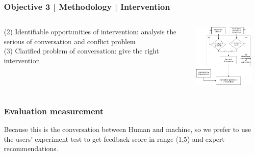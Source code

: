 \documentclass{beamer}
\begin{document}
\begin{frame}
\frametitle{Objective 3 | Methodology | Intervention}
\begin{columns}
	
	\begin{column}{.45\textwidth}
		(2) Identifiable opportunities of intervention: analysis the serious of conversation and conflict problem \\
		
		
		(3) Clarified problem of conversation: give the right intervention\\
	
	\end{column}
	\begin{column}{.55\textwidth}
		\includegraphics[width=50mm]{tsv.png}	
	\end{column}
	
\end{columns}
\end{frame}

\begin{frame}
\frametitle{Evaluation measurement}
Because this is the conversation between Human and machine, so we prefer to use the users' experiment test to get feedback score in range (1,5) and expert recommendations.


\end{frame}
\end{document}
